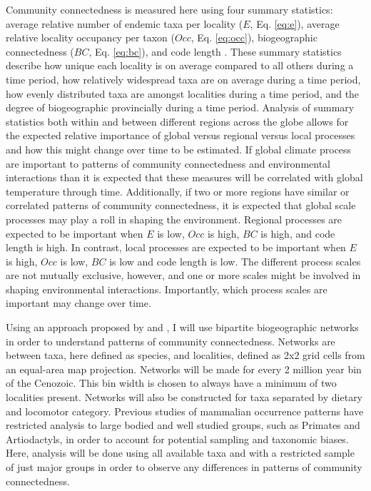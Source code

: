 \documentclass[12pt,letterpaper]{article}
\begin{document}
Community connectedness is measured here using four summary statistics: average relative number of endemic taxa per locality (\(E\), Eq. \ref{eq:e}), average relative locality occupancy per taxon (\(Occ\), Eq. \ref{eq:occ}), biogeographic connectedness (\(BC\), Eq. \ref{eq:bc}), and code length \citep{Rosvall2008,Rosvall2009a,Sidor2013}. These summary statistics describe how unique each locality is on average compared to all others during a time period, how relatively widespread taxa are on average during a time period, how evenly distributed taxa are amongst localities during a time period, and the degree of biogeographic provincially during a time period. Analysis of summary statistics both within and between different regions across the globe allows for the expected relative importance of global versus regional versus local processes and how this might change over time to be estimated. If global climate process are important to patterns of community connectedness and environmental interactions than it is expected that these measures will be correlated with global temperature through time. Additionally, if two or more regions have similar or correlated patterns of community connectedness, it is expected that global scale processes may play a roll in shaping the environment. Regional processes are expected to be important when \(E\) is low, \(Occ\) is high, \(BC\) is high, and code length is high. In contrast, local processes are expected to be important when \(E\) is high, \(Occ\) is low, \(BC\) is low and code length is low. The different process scales are not mutually exclusive, however, and one or more scales might be involved in shaping environmental interactions. Importantly, which process scales are important may change over time.

Using an approach proposed by \citet{Sidor2013} and \citet{Vilhena2013}, I will use bipartite biogeographic networks in order to understand patterns of community connectedness. Networks are between taxa, here defined as species, and localities, defined as 2x2 grid cells from an equal-area map projection. Networks will be made for every 2 million year bin of the Cenozoic. This bin width is chosen to always have a minimum of two localities present. Networks will also be constructed for taxa separated by dietary and locomotor category. Previous studies of mammalian occurrence patterns have restricted analysis to large bodied and well studied groups, such as Primates and Artiodactyls, in order to account for potential sampling and taxonomic biases. Here, analysis will be done using all available taxa and with a restricted sample of just major groups in order to observe any differences in patterns of community connectedness. 
\end{document}
